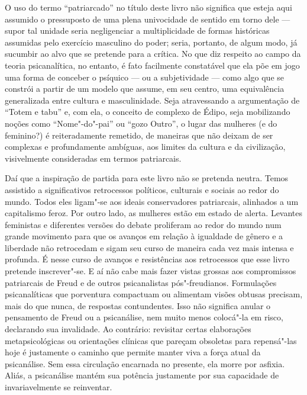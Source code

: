 O uso do termo ``patriarcado'' no título deste livro não significa que
esteja aqui assumido o pressuposto de uma plena univocidade de sentido
em torno dele --- supor tal unidade seria negligenciar a multiplicidade
de formas históricas assumidas pelo exercício masculino do poder; seria,
portanto, de algum modo, já sucumbir ao alvo que se pretende para a
crítica. No que diz respeito ao campo da teoria psicanalítica, no
entanto, é fato facilmente constatável que ela põe em jogo uma forma de
conceber o psíquico --- ou a subjetividade --- como algo que se constrói a
partir de um modelo que assume, em seu centro, uma equivalência
generalizada entre cultura e masculinidade. Seja atravessando a
argumentação de ``Totem e tabu'' e, com ela, o conceito de complexo de
Édipo, seja mobilizando noções como ``Nome"-do"-pai'' ou ``gozo Outro'', o
lugar das mulheres (e do feminino?) é reiteradamente remetido, de
maneiras que não deixam de ser complexas e profundamente ambíguas, aos
limites da cultura e da civilização, visivelmente consideradas em termos
patriarcais.

Daí que a inspiração de partida para este livro não se pretenda neutra.
Temos assistido a significativos retrocessos políticos, culturais e
sociais ao redor do mundo. Todos eles ligam"-se aos ideais conservadores
patriarcais, alinhados a um capitalismo feroz. Por outro lado, as
mulheres estão em estado de alerta. Levantes feministas e diferentes
versões do debate proliferam ao redor do mundo num grande movimento para
que os avanços em relação à igualdade de gênero e a liberdade não
retrocedam e sigam seu curso de maneira cada vez mais intensa e
profunda. É nesse curso de avanços e resistências aos retrocessos que
esse livro pretende inscrever"-se. E aí não cabe mais fazer vistas
grossas aos compromissos patriarcais de Freud e de outros psicanalistas
pós"-freudianos. Formulações psicanalíticas que porventura compactuam ou
alimentam visões obtusas precisam, mais do que nunca, de respostas
contundentes. Isso não significa anular o pensamento de Freud ou a
psicanálise, nem muito menos colocá"-la em risco, declarando sua
invalidade. Ao contrário: revisitar certas elaborações metapsicológicas
ou orientações clínicas que pareçam obsoletas para repensá"-las hoje é
justamente o caminho que permite manter viva a força atual da
psicanálise. Sem essa circulação encarnada no presente, ela morre por
asfixia. Aliás, a psicanálise mantém sua potência justamente por sua
capacidade de invariavelmente se reinventar.

